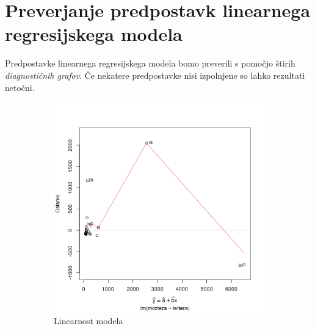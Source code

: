 \section{Preverjanje predpostavk linearnega regresijskega modela}

Predpostavke linearnega regresijskega modela bomo preverili s pomočjo štirih \emph{diagnostičnih grafov}.
Če nekatere predpostavke nisi izpolnjene so lahko rezultati netočni.

\begin{figure}[h]
    \centering
    \begin{subfigure}[t]{0.49\textwidth}
        \includegraphics[width=\textwidth]{res/linearnost-modela.png}
        \caption{Linearnost modela}
        \label{img:linearnost-modela}
    \end{subfigure}
    \hfill
    \begin{subfigure}[t]{0.49\textwidth}

\end{subfigure}
\end{figure}
